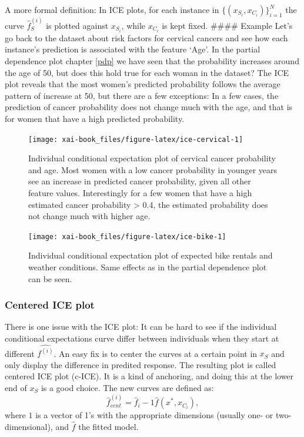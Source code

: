 \documentclass[12pt,]{krantz}
\theoremstyle{definition}
\theoremstyle{definition}
\theoremstyle{definition}
\theoremstyle{remark}
\begin{document}
A more formal definition: In ICE plots, for each instance in
\(\{(x_{S_i}, x_{C_i})\}_{i=1}^N\) the curve \(\hat{f}_S^{(i)}\) is
plotted against \(x_{S_i}\), while \(x_{C_i}\) is kept fixed. \#\#\#\#
Example Let's go back to the dataset about risk factors for cervical
cancers and see how each instance's prediction is associated with the
feature `Age'. In the partial dependence plot chapter \ref{pdp} we have
seen that the probability increases around the age of 50, but does this
hold true for each woman in the dataset? The ICE plot reveals that the
most women's predicted probability follows the average pattern of
increase at 50, but there are a few exceptions: In a few cases, the
prediction of cancer probability does not change much with the age, and
that is for women that have a high predicted probability.

\begin{figure}

{\centering \texttt{[image: xai-book\_files/figure-latex/ice-cervical-1]} 

}

\caption{Individual conditional expectation plot of cervical cancer probability and age. Most women with a low cancer probability in younger years see an increase in predicted cancer probability, given all other feature values. Interestingly for a few women that have a high estimated cancer probability > 0.4, the estimated probability does not change much with higher age. }\label{fig:ice-cervical}
\end{figure}

\begin{figure}

{\centering \texttt{[image: xai-book\_files/figure-latex/ice-bike-1]} 

}

\caption{Individual conditional expectation plot of expected bike rentals and weather conditions. Same effects as in the partial dependence plot can be seen.}\label{fig:ice-bike}
\end{figure}

\subsubsection{Centered ICE plot}\label{centered-ice-plot}

There is one issue with the ICE plot: It can be hard to see if the
individual conditional expectations curve differ between individuals
when they start at different \(\hat{f^{(i)}}\). An easy fix is to center
the curves at a certain point in \(x_S\) and only display the difference
in predited response. The resulting plot is called centered ICE plot
(c-ICE). It is a kind of anchoring, and doing this at the lower end of
\(x_S\) is a good choice. The new curves are defined as:
\[\hat{f}_{cent}^{(i)} = \hat{f}_i - 1\hat{f}(x^{\text{*}}, x_{C_i}), \]
where \(1\) is a vector of 1's with the appropriate dimensions (usually
one- or two-dimensional), and \(\hat{f}\) the fitted model.
\end{document}

